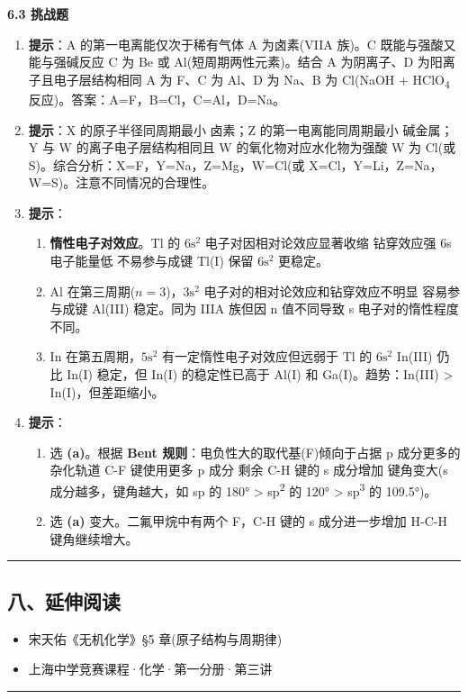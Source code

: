 \textbf{6.3 挑战题}

\begin{enumerate}
\def\labelenumi{\arabic{enumi}.}
\setcounter{enumi}{10}
\item
  \textbf{提示}：A 的第一电离能仅次于稀有气体 \箭 A 为卤素(VIIA 族)。C 既能与强酸又能与强碱反应 \箭 C 为 Be 或 Al(短周期两性元素)。结合 A 为阴离子、D 为阳离子且电子层结构相同 \箭 A 为 F、C 为 Al、D 为 Na、B 为 Cl(NaOH + HClO\textsubscript{4} 反应)。答案：A=F，B=Cl，C=Al，D=Na。
\item
  \textbf{提示}：X 的原子半径同周期最小 \箭 卤素；Z 的第一电离能同周期最小 \箭 碱金属；Y 与 W 的离子电子层结构相同且 W 的氧化物对应水化物为强酸 \箭 W 为 Cl(或 S)。综合分析：X=F，Y=Na，Z=Mg，W=Cl(或 X=Cl，Y=Li，Z=Na，W=S)。注意不同情况的合理性。
\item
  \textbf{提示}：

  \begin{enumerate}
  \def\labelenumii{(\arabic{enumii})}
  \tightlist
  \item
    \textbf{惰性电子对效应}。Tl 的 \(6\mathrm{s}^2\) 电子对因相对论效应显著收缩 \箭 钻穿效应强 \箭 6s 电子能量低 \箭 不易参与成键 \箭 Tl(I) 保留 \(6\mathrm{s}^2\) 更稳定。
  \item
    Al 在第三周期(\(n=3\))，\(3\mathrm{s}^2\) 电子对的相对论效应和钻穿效应不明显 \箭 容易参与成键 \箭 Al(III) 稳定。同为 IIIA 族但因 n 值不同导致 s 电子对的惰性程度不同。
  \item
    In 在第五周期，\(5\mathrm{s}^2\) 有一定惰性电子对效应但远弱于 Tl 的 \(6\mathrm{s}^2\) \箭 In(III) 仍比 In(I) 稳定，但 In(I) 的稳定性已高于 Al(I) 和 Ga(I)。趋势：In(III) \textgreater{} In(I)，但差距缩小。
  \end{enumerate}
\item
  \textbf{提示}：

  \begin{enumerate}
  \def\labelenumii{(\arabic{enumii})}
  \tightlist
  \item
    选 \textbf{(a)}。根据 \textbf{Bent 规则}：电负性大的取代基(F)倾向于占据 p 成分更多的杂化轨道 \箭 C-F 键使用更多 p 成分 \箭 剩余 C-H 键的 s 成分增加 \箭 键角变大(s 成分越多，键角越大，如 sp 的 180° \textgreater{} sp\textsuperscript{2} 的 120° \textgreater{} sp\textsuperscript{3} 的 109.5°)。
  \item
    选 \textbf{(a)} 变大。二氟甲烷中有两个 F，C-H 键的 s 成分进一步增加 \箭 H-C-H 键角继续增大。
  \end{enumerate}
\end{enumerate}

\begin{center}\rule{0.5\linewidth}{0.5pt}\end{center}

\subsection{八、延伸阅读}\label{ux516bux5ef6ux4f38ux9605ux8bfb}

\begin{itemize}
\tightlist
\item
  宋天佑《无机化学》§5 章(原子结构与周期律)
\item
  上海中学竞赛课程·化学·第一分册·第三讲
\end{itemize}

\begin{center}\rule{0.5\linewidth}{0.5pt}\end{center}
